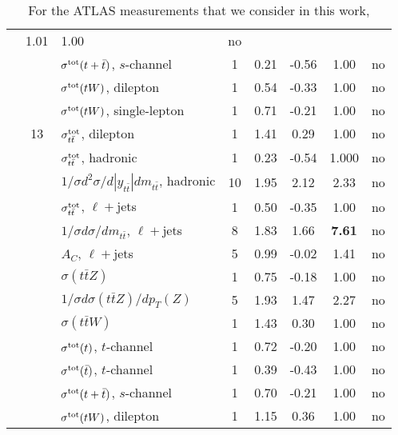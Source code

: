 \begin{table}[htbp]
\begin{center}
{\begin{tabularx}{\textwidth}{ccXccccl}
  & 1.01
  & 1.00
  &  no \\
  & 
  & $\sigma^{\rm tot}(t + \bar{t})$, $s$-channel
  & 1
  & 0.21 
  & -0.56
  & 1.00
  & no  \\
  & 
  & $\sigma^{\rm tot}(t W)$, dilepton
  & 1
  & 0.54 
  & -0.33
  & 1.00
  & no  \\
  & 
  & $\sigma^{\rm tot}(t W)$, single-lepton
  & 1
  & 0.71  
  & -0.21
  & 1.00
  & no  \\
  \midrule
 &13
  & $\sigma_{t\bar{t}}^{\rm tot}$, dilepton
  & 1
  & 1.41
  & 0.29
  & 1.00
  & no \\
     &
     & $\sigma_{t\bar{t}}^{\rm tot}$, hadronic
  & 1
  & 0.23 
  & -0.54
  & 1.000
  & no \\
     &
     & $1/\sigma d^2\sigma/d|y_{t\bar{t}}|dm_{t\bar{t}}$, hadronic 
  & 10
  & 1.95 
  & 2.12
  & 2.33
  & no\\ 
     &
     & $\sigma_{t\bar{t}}^{\rm tot}$, $\ell+$jets 
  & 1
  & 0.50
  & -0.35
  & 1.00 
  & no\\ 
     &
     & $1/\sigma d\sigma/dm_{t\bar{t}}$, $\ell+$jets
  & 8
  & 1.83
  & 1.66
  & {\bf 7.61}
  & no\\
  &
  & $A_C$, $\ell+$jets
  & 5
  & 0.99
  & -0.02
  & 1.41
  & no\\
  & 
  & $\sigma(t\bar{t}Z)$
  & 1
  & 0.75
  & -0.18
  & 1.00
  &  no \\
  &
  & $1/\sigma d\sigma(t\bar{t}Z)/dp_T(Z)$
  & 5
  & 1.93
  & 1.47
  & 2.27 
  & no\\
  &
  & $\sigma(t\bar{t}W)$
  & 1
  & 1.43
  & 0.30
  & 1.00 
  & no\\
  & 
  & $\sigma^{\rm tot}(t)$, $t$-channel
  & 1
  & 0.72  
  & -0.20
  & 1.00
  & no  \\
  & 
  & $\sigma^{\rm tot}(\bar{t})$, $t$-channel
  & 1
  & 0.39 
  & -0.43
  & 1.00
  & no  \\
  & 
  & $\sigma^{\rm tot}(t + \bar{t})$, $s$-channel
  & 1
  & 0.70
  & -0.21
  & 1.00
  & no  \\
  & 
  & $\sigma^{\rm tot}(t W)$, dilepton
  & 1
  & 1.15
  & 0.36
  & 1.00
  & no  \\
  \bottomrule
   \end{tabularx}
   \vspace{0.3cm}
   \caption{\small For the ATLAS measurements that we consider in this work,
}}
\end{center}
\end{table}
